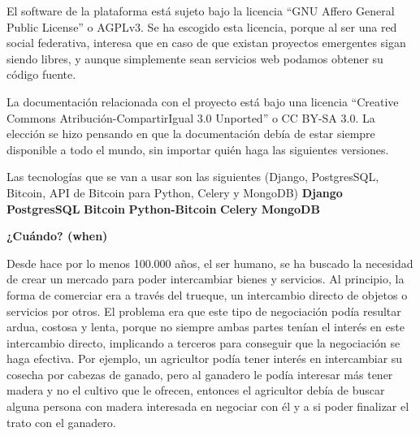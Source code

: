 \documentclass[a4paper, 12pt]{book}
\begin{document}
El software de la plataforma está sujeto bajo la licencia 
``GNU Affero General Public License'' o AGPLv3. 
Se ha escogido esta licencia, porque al ser una red social 
federativa, interesa que en caso de que existan proyectos emergentes sigan 
siendo libres, y aunque simplemente sean servicios web podamos obtener su 
código fuente.

La documentación relacionada con el proyecto está bajo una licencia 
``Creative Commons Atribución-CompartirIgual 3.0 Unported'' o CC BY-SA 3.0. 
La elección se hizo pensando en que la documentación debía de estar siempre 
disponible a todo el mundo, sin importar quién haga las siguientes versiones.

Las tecnologías que se van a usar son las siguientes (Django, PostgresSQL, 
Bitcoin, API de Bitcoin para Python, Celery y MongoDB)
\textbf{Django}
\textbf{PostgresSQL}
\textbf{Bitcoin}
\textbf{Python-Bitcoin}
\textbf{Celery}
\textbf{MongoDB}

\textbf{¿Cuándo? (when)}

Desde hace por lo menos 100.000 años, el ser humano, se ha buscado la necesidad 
de crear un mercado para poder intercambiar bienes y servicios. Al principio, 
la forma de comerciar era a través del trueque, un intercambio directo de 
objetos o servicios por otros. El problema era que este tipo de negociación 
podía resultar ardua, costosa y lenta, porque no siempre ambas partes tenían el 
interés en este intercambio directo, implicando a terceros para conseguir que 
la negociación se haga efectiva. Por ejemplo, un agricultor podía tener interés 
en intercambiar su cosecha por cabezas de ganado, pero al ganadero le podía 
interesar más tener madera y no el cultivo que le ofrecen, entonces el 
agricultor debía de buscar alguna persona con madera interesada en negociar 
con él y a si poder finalizar el trato con el ganadero.
\end{document}
